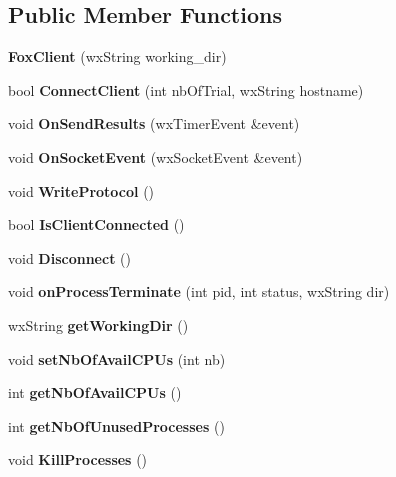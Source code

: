 \subsection*{Public Member Functions}
\begin{DoxyCompactItemize}
\item 
\mbox{\label{class_fox_client_a5aa888528be18eb80f6d0219eaf4ae0c}} 
{\bfseries Fox\+Client} (wx\+String working\+\_\+dir)
\item 
\mbox{\label{class_fox_client_abf48201add9882a8fe385196b943aa11}} 
bool {\bfseries Connect\+Client} (int nb\+Of\+Trial, wx\+String hostname)
\item 
\mbox{\label{class_fox_client_a4dcb42c2a4138f3133b6a172bb0e64b7}} 
void {\bfseries On\+Send\+Results} (wx\+Timer\+Event \&event)
\item 
\mbox{\label{class_fox_client_ab4be9a52d869b2adec0331d4f8d5bff5}} 
void {\bfseries On\+Socket\+Event} (wx\+Socket\+Event \&event)
\item 
\mbox{\label{class_fox_client_a51c23f9269fbc89b43622ebede533ab7}} 
void {\bfseries Write\+Protocol} ()
\item 
\mbox{\label{class_fox_client_a6817341baf753acc98473769437fa798}} 
bool {\bfseries Is\+Client\+Connected} ()
\item 
\mbox{\label{class_fox_client_ab8b45223c603d8854cfe60b6cb879e96}} 
void {\bfseries Disconnect} ()
\item 
\mbox{\label{class_fox_client_af64b76a2c9b78f39da2747a30ba384e0}} 
void {\bfseries on\+Process\+Terminate} (int pid, int status, wx\+String dir)
\item 
\mbox{\label{class_fox_client_ab5bd61265cd1b2534b9858334a5e13e0}} 
wx\+String {\bfseries get\+Working\+Dir} ()
\item 
\mbox{\label{class_fox_client_a3aec79a94e3fbf5a901ae20632597c38}} 
void {\bfseries set\+Nb\+Of\+Avail\+C\+P\+Us} (int nb)
\item 
\mbox{\label{class_fox_client_a68b058f3f9352708763a4553d1280969}} 
int {\bfseries get\+Nb\+Of\+Avail\+C\+P\+Us} ()
\item 
\mbox{\label{class_fox_client_a1a6b38f9898ba312f8e90edde4bba9a3}} 
int {\bfseries get\+Nb\+Of\+Unused\+Processes} ()
\item 
\mbox{\label{class_fox_client_a3ddd0f4988d82ab484ec2991b9f0f65c}} 
void {\bfseries Kill\+Processes} ()
\end{DoxyCompactItemize}
